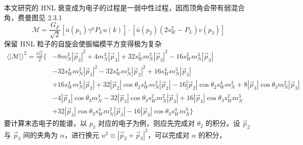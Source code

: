 \documentclass[printMode=false, declarePage=false]{ecnuthesis}
\begin{document}
\begin{appendix}
\begin{enumerate}
          本文研究的 HNL 衰变成为电子的过程是一弱中性过程，因而顶角会带有弱混合角，费曼图见 2.3.1
          \begin{equation}
            \mathcal{M} = \frac{G_F}{\sqrt{2}} [\bar{u}(p_1) \gamma^\mu P_L u(k)] \cdot [ \bar{u}(p_2) (2 s_W^2 - P_L) v(p_3)]
          \end{equation}
          保留 HNL 粒子的自旋会使振幅模平方变得极为复杂
          \begin{equation}
            \begin{split}
              \langle |\mathcal{M}| \rangle^2 = \frac{G_F^2}{2} \{ & - 8 m_N^2 |\overrightarrow{p}_3|^2 + 4 m_N^3 |\overrightarrow{p}_3| + 32  s_W^2 m_N^2 |\overrightarrow{p}_3|^2 - 16  s_W^2 m_N^3 |\overrightarrow{p}_3|                                                                                                     \\
                                                                   & - 32  s_W^4 m_N^2 |\overrightarrow{p}_3|^2 - 32  s_W^4 m_N^2  |\overrightarrow{p}_2|^2 + 16  s_W^4 m_N^3 |\overrightarrow{p}_3|                                                                                                                             \\
                                                                   & + 16  s_W^4 m_N^3  |\overrightarrow{p}_2| + 32  |\overrightarrow{p}_2| \cos{\theta_2}  s_W^4 m_N^2  |\overrightarrow{p}_2| - 16  |\overrightarrow{p}_2| \cos{\theta_2}  s_W^4 m_N^3 + 8  |\overrightarrow{p}_3| \cos{\theta_3} m_N^2 |\overrightarrow{p}_3| \\
                                                                   & - 4  |\overrightarrow{p}_3| \cos{\theta_3} m_N^3 - 32  |\overrightarrow{p}_3| \cos{\theta_3}  s_W^2 m_N^2 |\overrightarrow{p}_3| + 16  |\overrightarrow{p}_3| \cos{\theta_3}  s_W^2 m_N^3                                                                   \\
                                                                   & + 32  |\overrightarrow{p}_3| \cos{\theta_3}  s_W^4 m_N^2 |\overrightarrow{p}_3| - 16  |\overrightarrow{p}_3| \cos{\theta_3}  s_W^4 m_N^3 \}
            \end{split}
          \end{equation}
          要计算末态电子的能谱，以 $p_3$ 对应的电子为例，则应先完成对 $\theta_2$ 的积分。设 $\overrightarrow{p}_2$ 与 $\overrightarrow{p}_3$ 间的夹角为 $\alpha$，进行换元 $u^2 \equiv |\overrightarrow{p}_2 + \overrightarrow{p}_3|^2$，可以完成对 $\alpha$ 的积分，

\end{enumerate}
\end{appendix}
\end{document}
